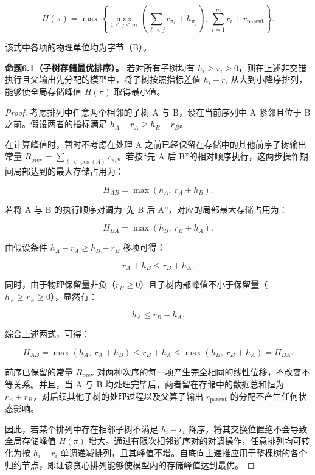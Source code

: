 \documentclass[anonymous,withtoc]{gmcm2026}
\begin{document}
\begin{equation}
H(\pi) = \max \left\{ \max_{1 \le j \le m} \left( \sum_{\ell < j} r_{\pi_\ell} + h_{\pi_j} \right), \ \sum_{i=1}^m r_i + r_{\mathrm{parent}} \right\}.
\end{equation}

该式中各项的物理单位均为字节（B）。

\textbf{命题6.1（子树存储最优排序）。} 若对所有子树均有 \(h_i \ge r_i \ge 0\)，则在上述非交错执行且父输出先分配的模型中，将子树按照指标差值 \(h_i - r_i\) 从大到小降序排列，能够使全局存储峰值 \(H(\pi)\) 取得最小值。

\begin{proof} 考虑排列中任意两个相邻的子树 A 与 B，设在当前序列中 A 紧邻且位于 B 之前。假设两者的指标满足 \(h_A - r_A \ge h_B - r_B\)。

在计算峰值时，暂时不考虑在处理 A 之前已经保留在存储中的其他前序子树输出常量 \(R_{\mathrm{prev}} = \sum_{\ell < \operatorname{pos}(A)} r_{\pi_\ell}\)。若按``先 A 后 B''的相对顺序执行，这两步操作期间局部达到的最大存储占用为：

\begin{equation}
H_{AB} = \max(h_A, \ r_A + h_B).
\end{equation}

若将 A 与 B 的执行顺序对调为``先 B 后 A''，对应的局部最大存储占用为：

\begin{equation}
H_{BA} = \max(h_B, \ r_B + h_A).
\end{equation}

由假设条件 \(h_A - r_A \ge h_B - r_B\) 移项可得：

\begin{equation}
r_A + h_B \le r_B + h_A.
\end{equation}

同时，由于物理保留量非负（\(r_B \ge 0\)）且子树内部峰值不小于保留量（\(h_A \ge r_A \ge 0\)），显然有：

\begin{equation}
h_A \le r_B + h_A.
\end{equation}

综合上述两式，可得：

\begin{equation}
H_{AB} = \max(h_A, \ r_A + h_B) \le r_B + h_A \le \max(h_B, \ r_B + h_A) = H_{BA}.
\end{equation}

前序已保留的常量 \(R_{\mathrm{prev}}\) 对两种次序的每一项产生完全相同的线性位移，不改变不等关系。并且，当 A 与 B 均处理完毕后，两者留在存储中的数据总和恒为 \(r_A + r_B\)，对后续其他子树的处理过程以及父算子输出 \(r_{\mathrm{parent}}\) 的分配不产生任何状态影响。

因此，若某个排列中存在相邻子树不满足 \(h_i - r_i\) 降序，将其交换位置绝不会导致全局存储峰值 \(H(\pi)\) 增大。通过有限次相邻逆序对的对调操作，任意排列均可转化为按 \(h_i - r_i\) 单调递减排列，且其峰值不增。自底向上递推应用于整棵树的各个归约节点，即证该贪心排列能够使模型内的存储峰值达到最优。 \end{proof}
\end{document}
